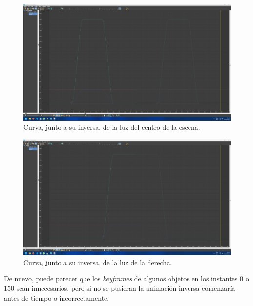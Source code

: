 \begin{figure}[H]
   \centering
   \includegraphics[width=\textwidth]{imagenes/curvas finales/LC.png}
   \caption{Curva, junto a su inversa, de la luz del centro de la escena.}
\end{figure}

\begin{figure}[H]
   \centering
   \includegraphics[width=\textwidth]{imagenes/curvas finales/LR.png}
   \caption{Curva, junto a su inversa, de la luz de la derecha.}
\end{figure}

De nuevo, puede parecer que los \textit{keyframes} de algunos objetos en los instantes 0 o 150 sean innecesarios, pero si no se pusieran la animación inversa comenzaría antes de tiempo o incorrectamente.